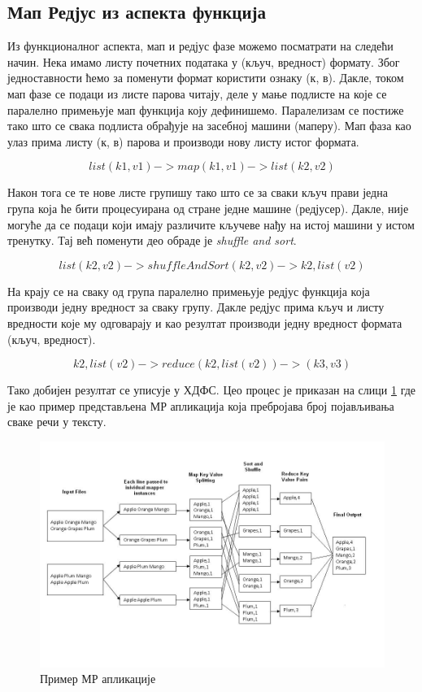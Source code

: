 \documentclass[12pt,oneside]{memoir}
\begin{document}
\subsection{Мап Редјус из аспекта функција}
\label{subsec:mr_funck_asp}

Из функционалног аспекта, мап и редјус фазе можемо посматрати на следећи начин. Нека имамо листу почетних података у (кључ, вредност) формату. Због једноставности ћемо за поменути формат користити ознаку (к, в). Дакле, током мап фазе се подаци из листе парова читају, деле у мање подлисте на које се паралелно примењује мап функција коју дефинишемо. Паралелизам се постиже тако што се свака подлиста обрађује на засебној машини (маперу). Мап фаза као улаз прима листу (к, в) парова и производи нову листу истог формата. \cite{hadoop_learning}

$$ list(k1, v1) -> map(k1, v1) -> list(k2, v2) $$

Након тога се те нове листе групишу тако што се за сваки кључ прави једна група која ће бити процесуирана од стране једне машине (редјусер). Дакле, није могуће да се подаци који имају различите кључеве нађу на истој машини у истом тренутку. Тај већ поменути део обраде је \textit{shuffle and sort}. 

$$ list(k2, v2) -> shuffleAndSort(k2, v2) -> k2, list(v2) $$

На крају се на сваку од група паралелно примењује редјус функција која производи једну вредност за сваку групу. Дакле редјус прима кључ и листу вредности које му одговарају и као резултат производи једну вредност формата (кључ, вредност). \cite{hadoop_learning}

$$ k2, list(v2) -> reduce(k2, list(v2)) -> (k3, v3) $$

Тако добијен резултат се уписује у ХДФС. Цео процес је приказан на слици \ref{fig:map_reduce} где је као пример представљена МР апликација која пребројава број појављивања сваке речи у тексту. \cite{hadoop_learning}

\begin{figure}[!ht]
  \centering
  \includegraphics[width=1\textwidth]{pictures/mapreduce_step2.jpg}
  \caption{Пример МР апликације}
  \label{fig:map_reduce}
\end{figure}
\end{document}
